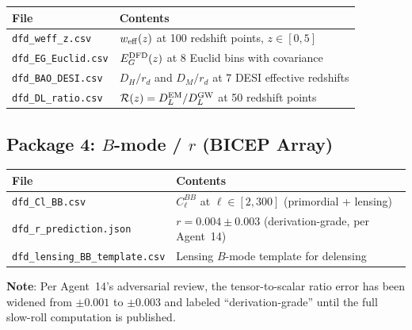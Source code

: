 \documentclass[11pt,a4paper]{article}
\begin{document}
\begin{center}
\begin{tabular}{ll}
\toprule
\textbf{File} & \textbf{Contents} \\
\midrule
\texttt{dfd\_weff\_z.csv} & $w_{\rm eff}(z)$ at 100 redshift points, $z \in [0, 5]$ \\
\texttt{dfd\_EG\_Euclid.csv} & $E_G^{\rm DFD}(z)$ at 8 Euclid bins with covariance \\
\texttt{dfd\_BAO\_DESI.csv} & $D_H/r_d$ and $D_M/r_d$ at 7 DESI effective redshifts \\
\texttt{dfd\_DL\_ratio.csv} & $\mathcal{R}(z) = D_L^{\rm EM}/D_L^{\rm GW}$ at 50 redshift points \\
\bottomrule
\end{tabular}
\end{center}

\subsection{Package 4: $B$-mode / $r$ (BICEP Array)}

\begin{center}
\begin{tabular}{ll}
\toprule
\textbf{File} & \textbf{Contents} \\
\midrule
\texttt{dfd\_Cl\_BB.csv} & $C_\ell^{BB}$ at $\ell \in [2, 300]$ (primordial + lensing) \\
\texttt{dfd\_r\_prediction.json} & $r = 0.004 \pm 0.003$ (derivation-grade, per Agent~14) \\
\texttt{dfd\_lensing\_BB\_template.csv} & Lensing $B$-mode template for delensing \\
\bottomrule
\end{tabular}
\end{center}

\textbf{Note}: Per Agent~14's adversarial review, the tensor-to-scalar ratio error has been widened from $\pm 0.001$ to $\pm 0.003$ and labeled ``derivation-grade'' until the full slow-roll computation is published.
\end{document}
